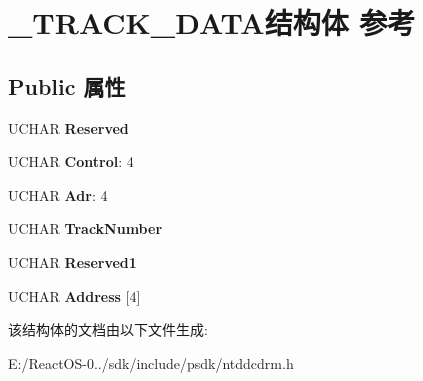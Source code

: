 \hypertarget{struct___t_r_a_c_k___d_a_t_a}{}\section{\+\_\+\+T\+R\+A\+C\+K\+\_\+\+D\+A\+T\+A结构体 参考}
\label{struct___t_r_a_c_k___d_a_t_a}
\subsection*{Public 属性}
\begin{DoxyCompactItemize}
\item 
\mbox{\label{struct___t_r_a_c_k___d_a_t_a_a81afa0f13ecc8763684df1c94bb7fe6e}} 
U\+C\+H\+AR {\bfseries Reserved}
\item 
\mbox{\label{struct___t_r_a_c_k___d_a_t_a_af17c9606877e9b44918c5b1ab6c54f81}} 
U\+C\+H\+AR {\bfseries Control}\+: 4
\item 
\mbox{\label{struct___t_r_a_c_k___d_a_t_a_a37c62132ab94b0af679cd905e6d6e2a4}} 
U\+C\+H\+AR {\bfseries Adr}\+: 4
\item 
\mbox{\label{struct___t_r_a_c_k___d_a_t_a_abca6c4706825c7707a1731d5ec1afe33}} 
U\+C\+H\+AR {\bfseries Track\+Number}
\item 
\mbox{\label{struct___t_r_a_c_k___d_a_t_a_a64bd940cdc94c2519eabfa4ce6b0f5e5}} 
U\+C\+H\+AR {\bfseries Reserved1}
\item 
\mbox{\label{struct___t_r_a_c_k___d_a_t_a_a4f8b15a9086f72892c94844b504e60b9}} 
U\+C\+H\+AR {\bfseries Address} \mbox{[}4\mbox{]}
\end{DoxyCompactItemize}


该结构体的文档由以下文件生成\+:\begin{DoxyCompactItemize}
\item 
E\+:/\+React\+O\+S-\/0../sdk/include/psdk/ntddcdrm.\+h\end{DoxyCompactItemize}
